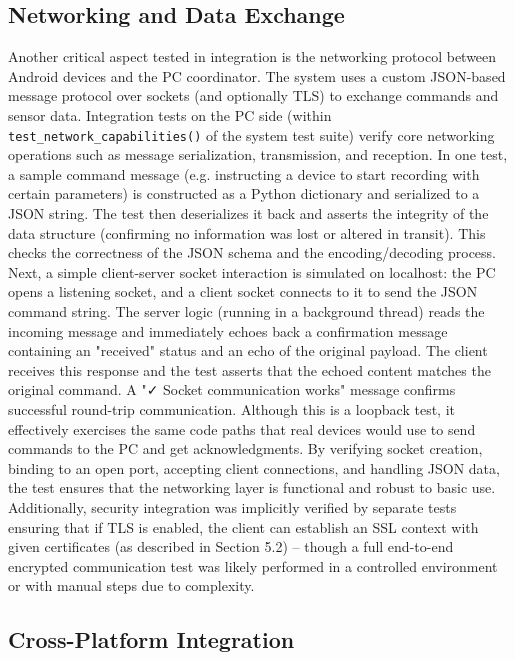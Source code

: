 \documentclass[11pt,a4paper]{report}
\begin{document}
\subsection{Networking and Data Exchange}

Another critical aspect tested in integration is the networking protocol between Android devices and the PC coordinator. The system uses a custom JSON-based message protocol over sockets (and optionally TLS) to exchange commands and sensor data. Integration tests on the PC side (within \texttt{test\_network\_capabilities()} of the system test suite) verify core networking operations such as message serialization, transmission, and reception. In one test, a sample command message (e.g. instructing a device to start recording with certain parameters) is constructed as a Python dictionary and serialized to a JSON string. The test then deserializes it back and asserts the integrity of the data structure (confirming no information was lost or altered in transit). This checks the correctness of the JSON schema and the encoding/decoding process. Next, a simple client-server socket interaction is simulated on localhost: the PC opens a listening socket, and a client socket connects to it to send the JSON command string. The server logic (running in a background thread) reads the incoming message and immediately echoes back a confirmation message containing an "received" status and an echo of the original payload. The client receives this response and the test asserts that the echoed content matches the original command. A "✓ Socket communication works" message confirms successful round-trip communication. Although this is a loopback test, it effectively exercises the same code paths that real devices would use to send commands to the PC and get acknowledgments. By verifying socket creation, binding to an open port, accepting client connections, and handling JSON data, the test ensures that the networking layer is functional and robust to basic use. Additionally, security integration was implicitly verified by separate tests ensuring that if TLS is enabled, the client can establish an SSL context with given certificates (as described in Section 5.2) – though a full end-to-end encrypted communication test was likely performed in a controlled environment or with manual steps due to complexity.

\subsection{Cross-Platform Integration}
\end{document}
